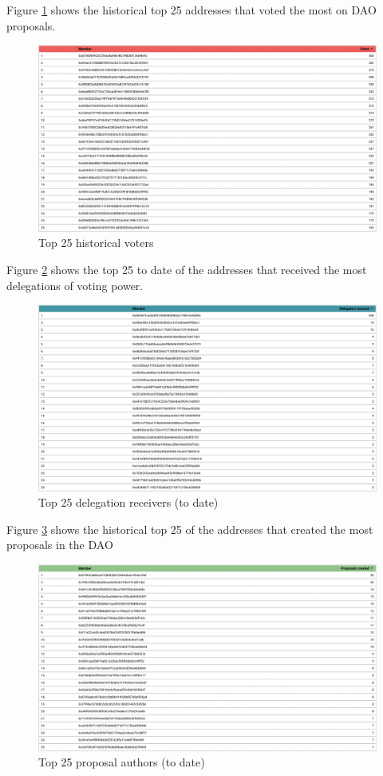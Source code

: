 \documentclass[MSE,Master,english]{twbook}%
\begin{document}
Figure \ref{fig:top_voters} shows the historical top 25 addresses that voted the most on DAO proposals.
\begin{figure}[H]
  \centering
  \includegraphics[width=\textwidth]{metrics/top_voters.png}
  \caption{Top 25 historical voters}
  \label{fig:top_voters}
\end{figure}

Figure \ref{fig:top_delegates} shows the top 25 to date of the addresses that received the most delegations of voting power.
\begin{figure}[H]
  \centering
  \includegraphics[width=\textwidth]{metrics/top_delegates.png}
  \caption{Top 25 delegation receivers (to date)}
  \label{fig:top_delegates}
\end{figure}

Figure \ref{fig:top_authors} shows the historical top 25 of the addresses that created the most proposals in the DAO
\begin{figure}[H]
  \centering
  \includegraphics[width=\textwidth]{metrics/top_authors.png}
  \caption{Top 25 proposal authors (to date)}
  \label{fig:top_authors}
\end{figure}
\end{document}
